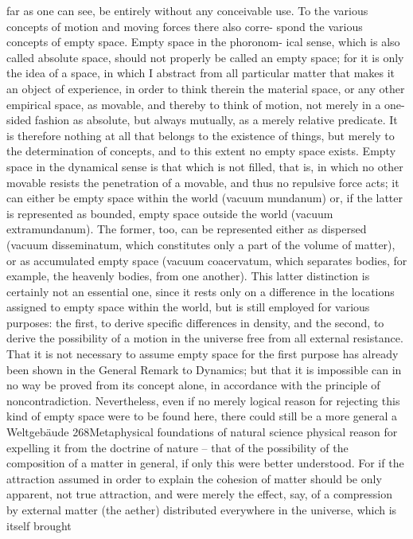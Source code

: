 far as one can see, be entirely without any conceivable use.
To the various concepts of motion and moving forces there also corre-
spond the various concepts of empty space. Empty space in the phoronom-
ical sense, which is also called absolute space, should not properly be
called an empty space; for it is only the idea of a space, in which I abstract
from all particular matter that makes it an object of experience, in order
to think therein the material space, or any other empirical space, as
movable, and thereby to think of motion, not merely in a one-sided
fashion as absolute, but always mutually, as a merely relative predicate.
It is therefore nothing at all that belongs to the existence of things, but
merely to the determination of concepts, and to this extent no empty
space exists. Empty space in the dynamical sense is that which is not ﬁlled,
that is, in which no other movable resists the penetration of a movable,
and thus no repulsive force acts; it can either be empty space within the
world (vacuum mundanum) or, if the latter is represented as bounded,
empty space outside the world (vacuum extramundanum). The former,
too, can be represented either as dispersed (vacuum disseminatum, which
constitutes only a part of the volume of matter), or as accumulated
empty space (vacuum coacervatum, which separates bodies, for example,
the heavenly bodies, from one another). This latter distinction is
certainly not an essential one, since it rests only on a difference in the
locations assigned to empty space within the world, but is still employed
for various purposes: the ﬁrst, to derive speciﬁc differences in density,
and the second, to derive the possibility of a motion in the universe free
from all external resistance. That it is not necessary to assume empty
space for the ﬁrst purpose has already been shown in the General Remark
to Dynamics; but that it is impossible can in no way be proved from its
concept alone, in accordance with the principle of noncontradiction.
Nevertheless, even if no merely logical reason for rejecting this kind of
empty space were to be found here, there could still be a more general
a
Weltgebäude
268Metaphysical foundations of natural science
physical reason for expelling it from the doctrine of nature – that of
the possibility of the composition of a matter in general, if only this
were better understood. For if the attraction assumed in order to explain
the cohesion of matter should be only apparent, not true attraction,
and were merely the effect, say, of a compression by external matter (the
aether) distributed everywhere in the universe, which is itself brought
